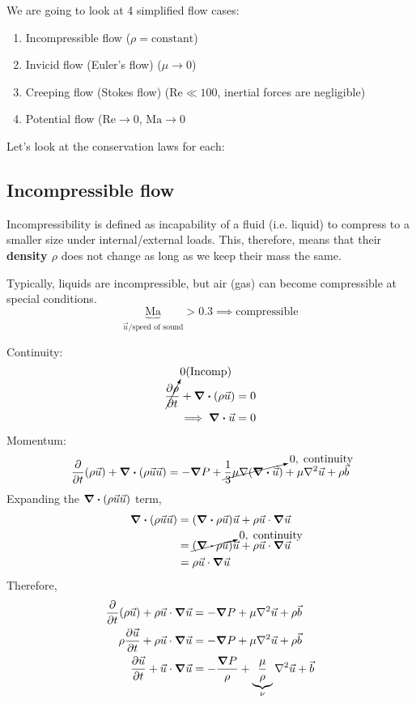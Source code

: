 We are going to look at 4 simplified flow cases:
\begin{enumerate}
    \item Incompressible flow ($\rho = \text{constant}$)
    \item Invicid flow (Euler's flow) ($\mu \to 0$)
    \item Creeping flow (Stokes flow) ($\text{Re} \ll 100$, inertial forces are negligible)
    \item Potential flow ($\text{Re} \to 0$, $\text{Ma} \to 0$
\end{enumerate}
Let's look at the conservation laws for each:
\subsection*{Incompressible flow}
Incompressibility is defined as incapability of a fluid (i.e. liquid) to compress to a smaller size
under internal/external loads. This, therefore, means that their \textbf{density $\rho$} does
not change as long as we keep their mass the same.

Typically, liquids are incompressible, but air (gas) can become compressible at special conditions.
\[
 \underbrace{\text{Ma}}_{\vec{u} /\text{speed of sound}} > 0.3 \implies \text{compressible}
\]

Continuity:
\begin{align*}
    \cancelto{0 (\text{Incomp})}{\frac{\partial \rho}{\partial t}} + \divergence (\rho \vec{u}) &= 0 \\
    \implies \divergence \vec{u} &= 0
\end{align*}
Momentum:
\begin{align*}
    \frac{\partial}{\partial t} (\rho \vec{u}) + \divergence (\rho \vec{u} \vec{u}) &=
    - \grad P + \cancelto{0, \;\text{continuity}}{\frac{1}{3} \mu \nabla(\divergence \vec{u})} + \mu \laplacian \vec{u} + \rho \vec{b} \\
\end{align*}
Expanding the $\divergence (\rho \vec{u} \vec{u})$ term,
\begin{align*}
    \divergence (\rho \vec{u} \vec{u}) &= (\divergence \rho \vec{u}) \vec{u}
        + \rho \vec{u} \cdot \grad \vec{u} \\
    &= \cancelto{0, \;\text{continuity}}{(\divergence \rho \vec{u})} \vec{u}
        + \rho \vec{u} \cdot \grad \vec{u} \\
    &= \rho \vec{u} \cdot \grad \vec{u}
\end{align*}
Therefore,
\begin{align*}
    \frac{\partial}{\partial t} (\rho \vec{u}) + \rho \vec{u} \cdot \grad \vec{u} &=
    - \grad P + \mu \laplacian \vec{u} + \rho \vec{b} \\
    \rho \frac{\partial \vec{u}}{\partial t} + \rho \vec{u} \cdot \grad \vec{u} &=
    - \grad P + \mu \laplacian \vec{u} + \rho \vec{b} \\
    \frac{\partial \vec{u}}{\partial t} + \vec{u} \cdot \grad \vec{u} &=
    -\frac{\grad P}{\rho} + \underbrace{\frac{\mu}{\rho}}_{\nu} \laplacian \vec{u} + \vec{b} \\
\end{align*}

